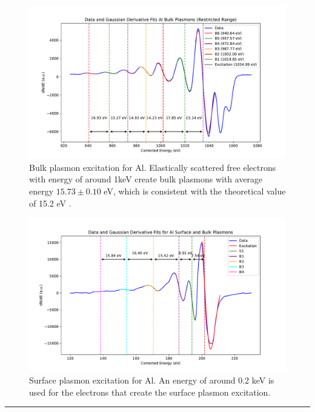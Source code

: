 \documentclass[12pt]{article}
\begin{document}
\begin{figure}[H]
  \includegraphics[scale = 0.49]{bulk.pdf}
  \caption{Bulk plasmon excitation for Al. Elastically scattered free electrons with energy of around 1keV create bulk plasmons with average energy $15.73 \pm 0.10$ eV, which is consistent with the theoretical value of 15.2 eV \cite{dufor}. }
  \label{bulkplasmonss}
\end{figure}

\begin{figure}[H]
  \includegraphics[scale = 0.49]{surfaceplasmons_30uV_156deg_300ms_1.9e-09mbar_200eV_Al_KLL_peaks_fit_with_baseline_plot_shifted.pdf}
  \caption{Surface plasmon excitation for Al. An energy of around 0.2 keV is used for the electrons that create the surface plasmon excitation. }
  \label{surfaceplasmonss}
\end{figure}



\rule{\textwidth}{0.5pt}
\end{document}
